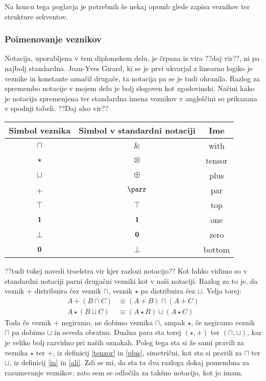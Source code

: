 Na koncu tega poglavja je potrebnih še nekaj opomb glede zapisa veznikov ter strukture sekventov.

\subsubsection{Poimenovanje veznikov}

Notacija, uporabljena v tem diplomskem delu, je črpana iz vira ??daj vir??, ni pa najbolj standardna. Jean-Yves Girard, ki se je prvi ukvarjal z linearno logiko je veznike in konstante označil drugače, ta notacija pa se je tudi ohranila. Razlog za spremembo notacije v mojem delu je bolj slogoven kot zgodovinski. Načini kako je notacija spremenjena ter standardna imena veznikov v angleščini so prikazana v spodnji tabeli. ??Daj also vir??
\begin{center}
\begin{tabular}{||c|c|c||}
    \hline
    Simbol veznika & Simbol v standardni notaciji & Ime \\
    \hline\hline
    $\sqcap$ & $\&$ & with \\
    \hline
    $\star$ & $\otimes$ & tensor \\
    \hline
    $\sqcup$ & $\oplus$ & plus \\
    \hline
    + & $\parr$ & par \\
    \hline
    $\top$ & $\top$ & top \\
    \hline
    $\mathbf{1}$ & $\mathbf{1}$ & one \\
    \hline
    $\bot$ & $\mathbf{0}$ & zero \\
    \hline
    $\mathbf{0}$ & $\bot$ & bottom \\
    \hline
    \end{tabular}
\end{center}

??tudi tukej navedi troelstra vir kjer razlozi notacijo??
Kot lahko vidimo so v standardni notaciji parni drugačni vezniki kot v naši notaciji. Razlog za to je, da veznik + distribuira čez veznik $\sqcap$, veznik $\star$ pa distribuira čez $\sqcup$. Velja torej:
\begin{align*}
    A + (B \sqcap C) &\equiv (A + B) \sqcap (A + C)\\
    A \star (B \sqcup C) &\equiv (A \star B) \sqcup (A \star C)
\end{align*}
Toda če veznik + negiramo, ne dobimo veznika $\sqcap$, ampak $\star$, če negiramo veznik $\sqcap$ pa dobimo $\sqcup$ in seveda obratno. Dualna para sta torej $(\star,+)$ ter $(\sqcap,\sqcup)$, kar je veliko bolj razvidno pri naših oznakah. Poleg tega sta si že sami pravili za veznika $\star$ ter +, iz definicij \ref{tenzor} in \ref{plus}, simetrični, kot sta si pravili za $\sqcap$ ter $\sqcup$, iz definicij \ref{in} in \ref{ali}. Zdi se mi, da sta ta dva razloga dokaj pomembna za razumevanje veznikov, zato sem se odločila za takšno notacijo, kot jo imam.

